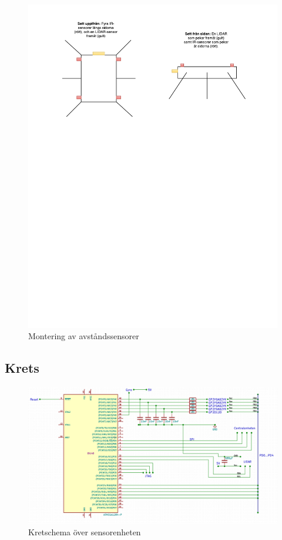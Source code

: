 \documentclass[a4paper,titlepage,12pt]{article}
\begin{document}
    \begin{figure}[h]
        \includegraphics[width=17cm, trim=2cm 18cm 0cm 0cm]{images/sensor_mount.pdf}
        \caption{Montering av avståndssensorer\label{fig:sensor_mount}}
    \end{figure}

    \newpage
    \subsection{Krets}

    \begin{figure}[h]
        \includegraphics[width=15cm]{images/schematic_sensor.png}
        \caption{Kretschema över sensorenheten\label{fig:schem_sensor}}
    \end{figure}
\end{document}
